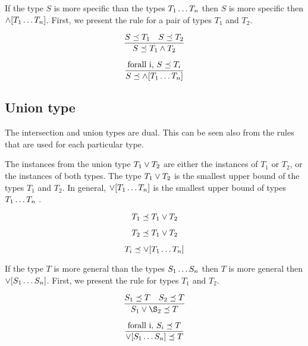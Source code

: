 \documentclass[runningheads]{llncs}
\begin{document}
If the type $S$ is more specific than the types $T_1\ldots\/T_n$ then
$S$ is more specific then $\land[T_1\ldots\/T_n]$. First, we present
the rule for a pair of types $T_1$ and $T_2$.

\begin{equation}
\dfrac{S\preceq\/T_1\quad\/S\preceq\/\/T_2}
      {S\preceq\/T_1\land\/T_2}  
\end{equation}

\begin{equation}
\dfrac{\text{forall i,\ } S\preceq\/T_i}
      {S\preceq\land[T_1\ldots\/T_n]}  
\end{equation}

\subsection{Union type}

The intersection and union types are dual. This can be seen also from
the rules that are used for each particular type.

The instances from the union type $T_1\lor\/T_2$ are either the
instances of $T_1$ or $T_2$, or the instances of both types. The type
$T_1\lor\/T_2$ is the smallest upper bound of the types $T_1$ and
$T_2$. In general, $\lor[T_1\ldots\/T_n]$ is the smallest upper bound
of types $T_1\ldots\/T_n$ \cite{Pierce90CalculusIntersectUnion}.

\begin{equation}
T_1\preceq\/T_1\lor\/T_2    
\end{equation}

\begin{equation}
T_2\preceq\/T_1\lor\/T_2  
\end{equation}

\begin{equation}
T_i\preceq\/\lor[T_1\ldots\/T_n]  
\end{equation}

If the type $T$ is more general than the types $S_1\ldots\/S_n$ then
$T$ is more general then $\lor[S_1\ldots\/S_n]$. First, we present
the rule for types $T_1$ and $T_2$.

\begin{equation}
\dfrac{S_1\preceq\/T\quad\/S_2\preceq\/\/T}
      {S_1\lor\S_2\preceq\/T}  
\end{equation}

\begin{equation}
\dfrac{\text{forall i,\ } S_i\preceq\/T}
      {\lor[S_1\ldots\/S_n]\preceq\/T}  
\end{equation}
\end{document}
